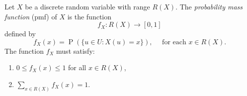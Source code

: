 \documentclass[10pt, headings=standardclasses, parskip=half, twoside]{scrartcl}
\begin{document}

\begin{definition}{}
    Let $X$ be a discrete random variable with range $R(X)$. The \textit{probability mass function} (pmf) of $X$ is the function
    \[
    f_{X}: R(X) \rightarrow[0,1]
    \]
    defined by
    \[
    f_{X}(x)=\operatorname{P}(\{u \in U: X(u)=x\}), \quad \text { for each } x \in R(X).
    \]
    The function $f_{X}$ must satisfy:  \begin{enumerate}
      \item $0 \leq f_{X}(x) \leq 1$ for all $x \in R(X)$,
      \item $\sum_{x \in R(X)} f_{X}(x)=1$. \qedhere
    \end{enumerate}
    \end{definition}
\end{document}
